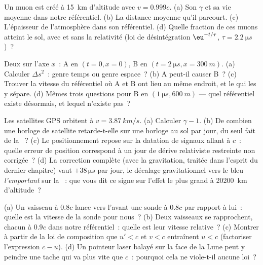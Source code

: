 \begin{exercise}[$\star$]\label{exo:b3:relativistic-kinematics:3}
Un muon est créé à \qty{15}{km} d'altitude avec $v = 0.999c$. (a) Son
$\gamma$ et sa vie moyenne dans notre référentiel. (b) La distance
moyenne qu'il parcourt. (c) L'épaisseur de l'atmosphère dans son
référentiel. (d) Quelle fraction de ces muons atteint le sol, avec et
sans la relativité (loi de désintégration $\eu^{-t/\tau}$,
$\tau = \qty{2.2}{\micro s}$)~?
\end{exercise}

\begin{exercise}[$\star$]\label{exo:b3:relativistic-kinematics:4}
Deux  sur l'axe $x$~: A en $(t = 0, x = 0)$, B en $(t =
\qty{2}{\micro s}, x = \qty{300}{m})$. (a) Calculer $\Delta s^2$~:
genre temps ou genre espace~? (b) A peut-il causer B~? (c) Trouver la
vitesse du référentiel où A et B ont lieu au même endroit, et le  qui les y sépare. (d) Mêmes trois questions pour B en
$(\qty{1}{\micro s}, \qty{600}{m})$ --- quel référentiel existe
désormais, et lequel n'existe pas~?
\end{exercise}

\begin{exercise}[$\star\star$]\label{exo:b3:relativistic-kinematics:5}
Les satellites GPS orbitent à $v = \qty{3.87}{km/s}$. (a) Calculer $\gamma -
1$. (b) De combien une horloge de satellite retarde-t-elle sur une
horloge au sol par jour, du seul fait de la ~? (c)
Le positionnement repose sur la datation de signaux allant à $c$~:
quelle erreur de position correspond à un jour de dérive
relativiste restreinte non corrigée~? (d) La correction complète (avec
la gravitation, traitée dans l'esprit du dernier chapitre) vaut
$+38\,\unit{\micro s}$ par jour, le décalage gravitationnel vers le
bleu \emph{l'emportant} sur la ~: que vous dit ce
signe sur l'effet le plus grand à \qty{20200}{km} d'altitude~?
\end{exercise}

\begin{exercise}[$\star\star$]\label{exo:b3:relativistic-kinematics:6}
(a) Un vaisseau à $0.8c$ lance vers l'avant une sonde à $0.8c$ par
rapport à lui~: quelle est la vitesse de la sonde pour nous~? (b) Deux
vaisseaux se rapprochent, chacun à $0.9c$ dans notre référentiel~:
quelle est leur vitesse relative~? (c) Montrer à partir de la loi de
composition que $u' < c$ et $v < c$ entraînent $u < c$ (factoriser
l'expression $c - u$). (d) Un pointeur laser balayé sur la face de la
Lune peut y peindre une tache qui va plus vite que $c$~: pourquoi cela
ne viole-t-il aucune loi~?
\end{exercise}

